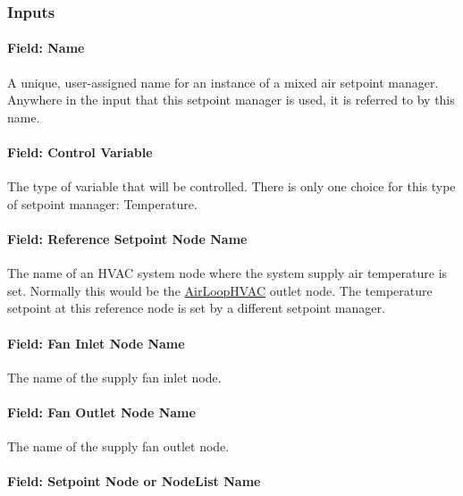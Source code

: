 \subsubsection{Inputs}\label{inputs-8-022}

\paragraph{Field: Name}\label{field-name-8-019}

A unique, user-assigned name for an instance of a mixed air setpoint manager. Anywhere in the input that this setpoint manager is used, it is referred to by this name.

\paragraph{Field: Control Variable}\label{field-control-variable-8}

The type of variable that will be controlled. There is only one choice for this type of setpoint manager: Temperature.

\paragraph{Field: Reference Setpoint Node Name}\label{field-reference-setpoint-node-name}

The name of an HVAC system node where the system supply air temperature is set. Normally this would be the \hyperref[airloophvac]{AirLoopHVAC} outlet node. The temperature setpoint at this reference node is set by a different setpoint manager.

\paragraph{Field: Fan Inlet Node Name}\label{field-fan-inlet-node-name}

The name of the supply fan inlet node.

\paragraph{Field: Fan Outlet Node Name}\label{field-fan-outlet-node-name-000}

The name of the supply fan outlet node.

\paragraph{Field: Setpoint Node or NodeList Name}\label{field-setpoint-node-or-nodelist-name-8}

